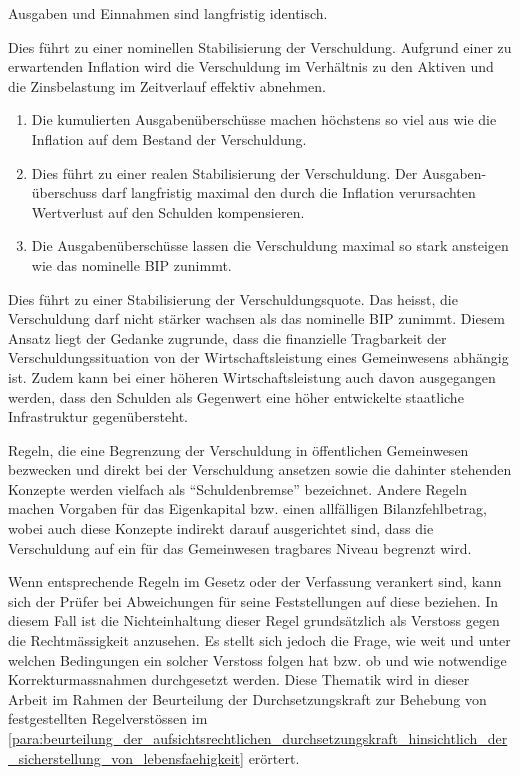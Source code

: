 \documentclass[10pt]{article}
\begin{document}
Ausgaben und Einnahmen sind langfristig identisch. 

Dies führt zu einer nominellen Stabilisierung der Verschuldung. Aufgrund einer zu erwartenden Inflation wird die Verschuldung im Verhältnis zu den Aktiven und die Zinsbelastung im Zeitverlauf effektiv abnehmen. 

\begin{enumerate}
    \item Die kumulierten Ausgabenüberschüsse machen höchstens so viel aus wie die Inflation auf dem Bestand der Verschuldung. 

    \item Dies führt zu einer realen Stabilisierung der Verschuldung. Der Ausgaben-überschuss darf langfristig maximal den durch die Inflation verursachten Wertverlust auf den Schulden kompensieren. 

    \item Die Ausgabenüberschüsse lassen die Verschuldung maximal so stark ansteigen wie das nominelle BIP zunimmt. 

\end{enumerate}

Dies führt zu einer Stabilisierung der Verschuldungsquote. Das heisst, die Verschuldung darf nicht stärker wachsen als das nominelle BIP zunimmt. Diesem Ansatz liegt der Gedanke zugrunde, dass die finanzielle Tragbarkeit der Verschuldungssituation von der Wirtschaftsleistung eines Gemeinwesens abhängig ist. Zudem kann bei einer höheren Wirtschaftsleistung auch davon ausgegangen werden, dass den Schulden als Gegenwert eine höher entwickelte staatliche Infrastruktur gegenübersteht. 

Regeln, die eine Begrenzung der Verschuldung in öffentlichen Gemeinwesen bezwecken und direkt bei der Verschuldung ansetzen sowie die dahinter stehenden Konzepte werden vielfach als “{}Schuldenbremse”{} bezeichnet. Andere Regeln machen Vorgaben für das Eigenkapital bzw. einen allfälligen Bilanzfehlbetrag, wobei auch diese Konzepte indirekt darauf ausgerichtet sind, dass die Verschuldung auf ein für das Gemeinwesen tragbares Niveau begrenzt wird. 

Wenn entsprechende Regeln im Gesetz oder der Verfassung verankert sind, kann sich der Prüfer bei Abweichungen für seine Feststellungen auf diese beziehen. In diesem Fall ist die Nichteinhaltung dieser Regel grundsätzlich als Verstoss gegen die Rechtmässigkeit anzusehen. Es stellt sich jedoch die Frage, wie weit und unter welchen Bedingungen ein solcher Verstoss folgen hat bzw. ob und wie notwendige Korrekturmassnahmen  durchgesetzt werden. Diese Thematik wird in dieser Arbeit im Rahmen der Beurteilung der Durchsetzungskraft zur Behebung von festgestellten Regelverstössen im \vref{para:beurteilung_der_aufsichtsrechtlichen_durchsetzungskraft_hinsichtlich_der_sicherstellung_von_lebensfaehigkeit} erörtert. 
\end{document}
